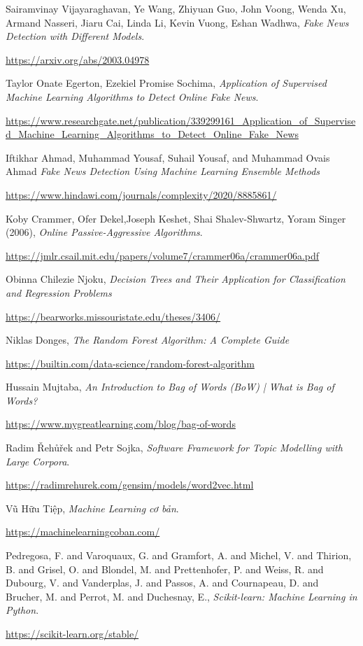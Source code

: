 \documentclass[12pt,a4paper,oneside]{book}
\begin{document}
\newpage
\renewcommand{\bibname}{\bf \LARGE \quad DANH MỤC TÀI LIỆU THAM KHẢO}
\baselineskip
18pt
\begin{thebibliography}{99}
	\bibitem{} Sairamvinay Vijayaraghavan, Ye Wang, Zhiyuan Guo, John Voong, Wenda Xu, Armand Nasseri, Jiaru Cai, Linda Li, Kevin Vuong, Eshan Wadhwa,
	\textit{Fake News Detection with Different Models}.
	
	\url{https://arxiv.org/abs/2003.04978}
	
	\bibitem{}Taylor Onate Egerton, Ezekiel Promise Sochima, \textit{Application of Supervised Machine Learning Algorithms to Detect Online Fake News}.
	
	\url{https://www.researchgate.net/publication/339299161_Application_of_Supervised_Machine_Learning_Algorithms_to_Detect_Online_Fake_News}
	
	\bibitem{}Iftikhar Ahmad, Muhammad Yousaf, Suhail Yousaf, and Muhammad Ovais Ahmad
	\textit{Fake News Detection Using Machine Learning Ensemble Methods}
	
	\url{https://www.hindawi.com/journals/complexity/2020/8885861/}
	
	\bibitem{} Koby Crammer, Ofer Dekel,Joseph Keshet, Shai Shalev-Shwartz, Yoram Singer (2006),
	\textit{Online Passive-Aggressive Algorithms}.

	\url{https://jmlr.csail.mit.edu/papers/volume7/crammer06a/crammer06a.pdf}

	\bibitem{}Obinna Chilezie Njoku,
	\textit{Decision Trees and Their Application for Classification and Regression Problems}
	
	\url{https://bearworks.missouristate.edu/theses/3406/}
	
	\bibitem{}Niklas Donges, 
	\textit{The Random Forest Algorithm: A Complete Guide}
	
	\url{https://builtin.com/data-science/random-forest-algorithm}
	
	\bibitem{}Hussain Mujtaba, 
	\textit{An Introduction to Bag of Words (BoW) | What is Bag of Words?}
	
	\url{https://www.mygreatlearning.com/blog/bag-of-words}
	
	\bibitem{} Radim {\v R}eh{\r u}{\v r}ek and Petr Sojka, \textit{Software Framework for Topic Modelling with Large Corpora}.
	
	\url{https://radimrehurek.com/gensim/models/word2vec.html}
	
	\bibitem{} Vũ Hữu Tiệp, \textit{Machine Learning cơ bản}.
	
	\url{https://machinelearningcoban.com/}
	
	\bibitem{}Pedregosa, F. and Varoquaux, G. and Gramfort, A. and Michel, V.
	         and Thirion, B. and Grisel, O. and Blondel, M. and Prettenhofer, P.
	         and Weiss, R. and Dubourg, V. and Vanderplas, J. and Passos, A. and
	         Cournapeau, D. and Brucher, M. and Perrot, M. and Duchesnay, E., \textit{Scikit-learn: Machine Learning in {P}ython}.
	         
	\url{https://scikit-learn.org/stable/}
	

	
\end{thebibliography}
\end{document}
